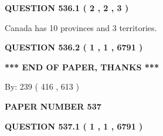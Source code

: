 \documentclass[12pt]{article}
\begin{document}
   
 \vspace{0.2in}
 
 
 
 
   
   
  
\vspace{0.2in}
  
{\textbf{\Large{QUESTION
536.1 
 ( 2 , 2 , 3 )
}}}
  
  
 
 
\noindent{}
 
 
Canada has 10  provinces and 3 territories.
 
 
 
 
  
\vspace{0.2in}
  
{\textbf{\Large{QUESTION
536.2 
 ( 1 , 1 , 6791 )
}}}
  
  
   
   
 \vspace{0.2in}
 
   
   
   
   
\vspace{1.0in} 
{\textbf{\large{ *** END OF PAPER, THANKS *** }}} 
   
   
\hspace{1.0in} By: 
 239 ( 416 ,  613 )
   
   
   
   
\newpage 
\setcounter{page}{ 
   537001 } 
   
   
   
   
 {\textbf{ \Large{ PAPER NUMBER  537  }}}
   
   
\vspace{0.2in}
   
   
   
   
   
   
 \vspace{0.2in}
 
 
 
 
   
   
  
\vspace{0.2in}
  
{\textbf{\Large{QUESTION
537.1 
 ( 1 , 1 , 6791 )
}}}
  
  
  
\end{document}
